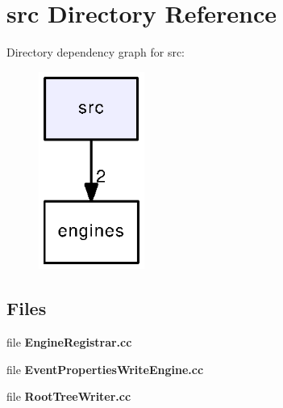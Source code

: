 \section{src Directory Reference}
\label{dir_68267d1309a1af8e8297ef4c3efbcdba}
Directory dependency graph for src\-:
\nopagebreak
\begin{figure}[H]
\begin{center}
\leavevmode
\includegraphics[width=98pt]{dir_68267d1309a1af8e8297ef4c3efbcdba_dep}
\end{center}
\end{figure}
\subsection*{Files}
\begin{DoxyCompactItemize}
\item 
file {\bfseries Engine\-Registrar.\-cc}
\item 
file {\bfseries Event\-Properties\-Write\-Engine.\-cc}
\item 
file {\bfseries Root\-Tree\-Writer.\-cc}
\end{DoxyCompactItemize}
